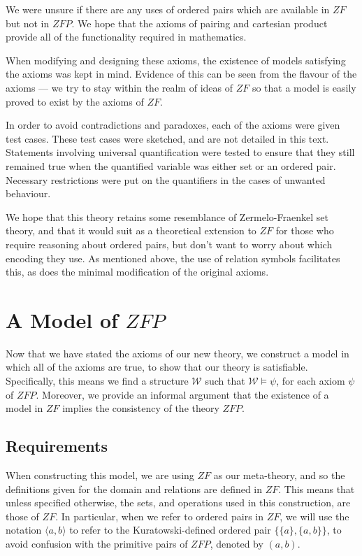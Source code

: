 \documentclass[11pt]{report}
\newcommand{\pair}[2]{\langle #1,#2 \rangle}
\theoremstyle{definition}
\theoremstyle{theorem}
\theoremstyle{lemma}
\begin{document}
We were unsure if there are any uses of ordered pairs which are available in $\mathit{ZF}$ but not in $\mathit{ZFP}$. 
We hope that the axioms of pairing and cartesian product provide all of the functionality required in mathematics. 

When modifying and designing these axioms, the existence of models satisfying the axioms was kept in mind. 
Evidence of this can be seen from the flavour of the axioms --- we try to stay within the realm of ideas of $\mathit{ZF}$ so that a model is easily proved to exist by the axioms of $\mathit{ZF}$. 

In order to avoid contradictions and paradoxes, each of the axioms were given test cases.
These test cases were sketched, and are not detailed in this text. 
Statements involving universal quantification were tested to ensure that they still remained true when the quantified variable was either set or an ordered pair.
Necessary restrictions were put on the quantifiers in the cases of unwanted behaviour. 

We hope that this theory retains some resemblance of Zermelo-Fraenkel set theory, and that it would suit as a theoretical extension to $\mathit{ZF}$ for those who require reasoning about ordered pairs, but don't want to worry about which encoding they use. 
As mentioned above, the use of relation symbols facilitates this, as does the minimal modification of the original axioms. 

\section{A Model of $\mathit{ZFP}$}
Now that we have stated the axioms of our new theory, we construct a model in which all of the axioms are true, to show that our theory is satisfiable.
Specifically, this means we find a structure $\mathcal{W}$ such that $\mathcal{W} \vDash \psi$, for each axiom $\psi$ of $\mathit{ZFP}$.
Moreover, we provide an informal argument that the existence of a model in $\mathit{ZF}$ implies the consistency of the theory $\mathit{ZFP}$. 

\subsection{Requirements}
When constructing this model, we are using $\mathit{ZF}$ as our meta-theory, and so the definitions given for the domain and relations are defined in $\mathit{ZF}$.
This means that unless specified otherwise, the sets, and operations used in this construction, are those of $\mathit{ZF}$.
In particular, when we refer to ordered pairs in $\mathit{ZF}$, we will use the notation $\pair{a}{b}$ to refer to the Kuratowski-defined ordered pair $\{\{a\}, \{a,b\}\}$, to avoid confusion with the primitive pairs of $\mathit{ZFP}$, denoted by $(a,b)$.
\end{document}
